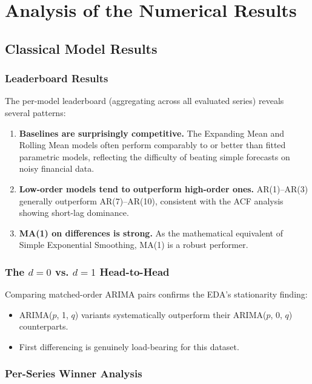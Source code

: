 \section{Analysis of the Numerical Results}
\label{sec:results}

\subsection{Classical Model Results}
\subsubsection{Leaderboard Results}

The per-model leaderboard (aggregating across all evaluated series) reveals several patterns:

\begin{enumerate}
    \item \textbf{Baselines are surprisingly competitive.} The Expanding Mean and Rolling Mean models often perform comparably to or better than fitted parametric models, reflecting the difficulty of beating simple forecasts on noisy financial data.
    \item \textbf{Low-order models tend to outperform high-order ones.} AR(1)--AR(3) generally outperform AR(7)--AR(10), consistent with the ACF analysis showing short-lag dominance.
    \item \textbf{MA(1) on differences is strong.} As the mathematical equivalent of Simple Exponential Smoothing, MA(1) is a robust performer.
\end{enumerate}

\subsubsection{The $d=0$ vs. $d=1$ Head-to-Head}

Comparing matched-order ARIMA pairs confirms the EDA's stationarity finding:
\begin{itemize}
    \item ARIMA($p$, 1, $q$) variants systematically outperform their ARIMA($p$, 0, $q$) counterparts.
    \item First differencing is genuinely load-bearing for this dataset.
\end{itemize}

\subsubsection{Per-Series Winner Analysis}


